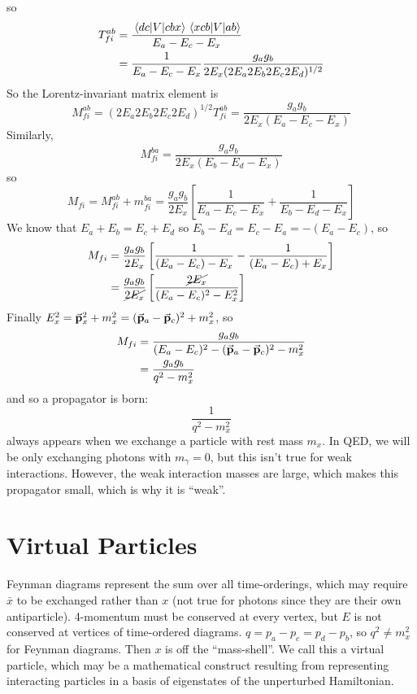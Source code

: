 \documentclass[a4paper,twoside,master.tex]{subfiles}
\begin{document}
so
\begin{align}
    T_{fi}^{ab} &= \frac{\mel{dc}{V}{cbx} \mel{xcb}{V}{ab}}{E_a - E_c - E_x} \\
                &= \frac{1}{E_a - E_c - E_x} \frac{g_a g_b}{2 E_x (2 E_a 2 E_b 2 E_c 2 E_d)^{1/2}}
\end{align}
So the Lorentz-invariant matrix element is
\begin{equation}
    M_{fi}^{ab} = (2 E_a 2 E_b 2 E_c 2 E_d)^{1/2} T_{fi}^{ab} = \frac{g_a g_b}{2 E_x (E_a - E_c - E_x)}
\end{equation}
Similarly,
\begin{equation}
    M_{fi}^{ba} = \frac{g_a g_b}{2 E_x (E_b - E_d - E_x)}
\end{equation}
so
\begin{equation}
    M_{fi} = M_{fi}^{ab} + m_{fi}^{ba} = \frac{g_a g_b}{2 E_x} \left[ \frac{1}{E_a - E_c - E_x} + \frac{1}{E_b - E_d - E_x} \right]
\end{equation}
We know that $ E_a + E_b = E_c + E_d $ so $ E_b - E_d = E_c - E_a = -(E_a - E_c) $, so
\begin{align}
    M_{fi} &= \frac{g_a g_b}{2E_x} \left[ \frac{1}{(E_a - E_c) - E_x} - \frac{1}{(E_a - E_c) + E_x} \right] \\
           &= \frac{g_a g_b}{\cancel{2 E_x}}  \left[ \frac{\cancel{2 E_x}}{(E_a - E_c)^2 - E_x^2} \right]
\end{align}
Finally
$ E_x^2 = \va{p}_x^2 + m_x^2 = (\va{p}_a - \va{p}_c)^2 + m_x^2 $, so
\begin{align}
    M_{fi} &= \frac{g_a g_b}{(E_a - E_c)^2 - (\va{p}_a - \va{p}_c)^2 - m_x^2} \\
           &= \frac{g_a g_b}{q^2 - m_x^2}
\end{align}
and so a propagator is born:
\begin{equation}
    \frac{1}{q^2 - m_x^2}
\end{equation}
always appears when we exchange a particle with rest mass $ m_x $. In QED, we will be only exchanging photons with $ m_{\gamma} = 0 $, but this isn't true for weak interactions. However, the weak interaction masses are large, which makes this propagator small, which is why it is ``weak''.

\section{Virtual Particles}\label{sec:virtual_particles}

Feynman diagrams represent the sum over all time-orderings, which may require $ \bar{x} $ to be exchanged rather than $ x $ (not true for photons since they are their own antiparticle). 4-momentum must be conserved at every vertex, but $ E $ is not conserved at vertices of time-ordered diagrams. $ q = p_a - p_c = p_d - p_b $, so $ q^2 \neq m_x^2 $ for Feynman diagrams. Then $ x $ is off the ``mass-shell''. We call this a virtual particle, which may be a mathematical construct resulting from representing interacting particles in a basis of eigenstates of the unperturbed Hamiltonian.
\end{document}
